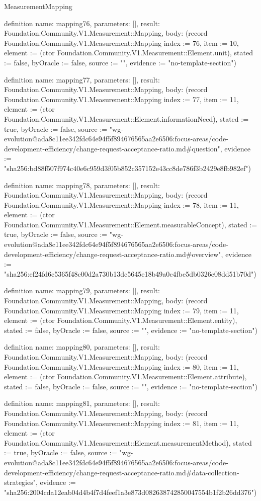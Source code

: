 \begin{lexlean}{MeasurementMapping}
\begin{semanticmodule}
definition{
  name: mapping76,
  parameters: [],
  result: Foundation.Community.V1.Measurement::Mapping,
  body: (record Foundation.Community.V1.Measurement::Mapping {index := 76, item := 10, element := (ctor Foundation.Community.V1.Measurement::Element.unit), stated := false, byOracle := false, source := "", evidence := "no-template-section"})
}

definition{
  name: mapping77,
  parameters: [],
  result: Foundation.Community.V1.Measurement::Mapping,
  body: (record Foundation.Community.V1.Measurement::Mapping {index := 77, item := 11, element := (ctor Foundation.Community.V1.Measurement::Element.informationNeed), stated := true, byOracle := false, source := "wg-evolution@ada8c11ee342fdc64e94f5f894676565aa2e6506:focus-areas/code-development-efficiency/change-request-acceptance-ratio.md#question", evidence := "sha256:bd88f507f974c40e6c959d3f05b852c357152e43cc8de786f3b2429e8fb982ef"})
}

definition{
  name: mapping78,
  parameters: [],
  result: Foundation.Community.V1.Measurement::Mapping,
  body: (record Foundation.Community.V1.Measurement::Mapping {index := 78, item := 11, element := (ctor Foundation.Community.V1.Measurement::Element.measurableConcept), stated := true, byOracle := false, source := "wg-evolution@ada8c11ee342fdc64e94f5f894676565aa2e6506:focus-areas/code-development-efficiency/change-request-acceptance-ratio.md#overview", evidence := "sha256:ef24fd6c5365f48c00d2a730b13dc5645e18b49a0c4fbe5db0326e08dd51b70d"})
}

definition{
  name: mapping79,
  parameters: [],
  result: Foundation.Community.V1.Measurement::Mapping,
  body: (record Foundation.Community.V1.Measurement::Mapping {index := 79, item := 11, element := (ctor Foundation.Community.V1.Measurement::Element.entity), stated := false, byOracle := false, source := "", evidence := "no-template-section"})
}

definition{
  name: mapping80,
  parameters: [],
  result: Foundation.Community.V1.Measurement::Mapping,
  body: (record Foundation.Community.V1.Measurement::Mapping {index := 80, item := 11, element := (ctor Foundation.Community.V1.Measurement::Element.attribute), stated := false, byOracle := false, source := "", evidence := "no-template-section"})
}

definition{
  name: mapping81,
  parameters: [],
  result: Foundation.Community.V1.Measurement::Mapping,
  body: (record Foundation.Community.V1.Measurement::Mapping {index := 81, item := 11, element := (ctor Foundation.Community.V1.Measurement::Element.measurementMethod), stated := true, byOracle := false, source := "wg-evolution@ada8c11ee342fdc64e94f5f894676565aa2e6506:focus-areas/code-development-efficiency/change-request-acceptance-ratio.md#data-collection-strategies", evidence := "sha256:2004cda12eab04d4b4f7d4feef1a3e873d082638742850047554b1f2b26dd376"})
}


\end{semanticmodule}
\end{lexlean}
